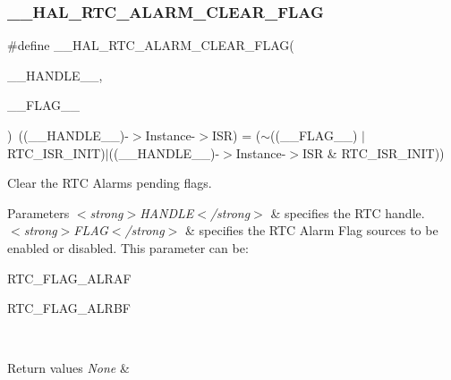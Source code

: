 \subsubsection{\texorpdfstring{\+\_\+\+\_\+\+H\+A\+L\+\_\+\+R\+T\+C\+\_\+\+A\+L\+A\+R\+M\+\_\+\+C\+L\+E\+A\+R\+\_\+\+F\+L\+AG}{\_\_HAL\_RTC\_ALARM\_CLEAR\_FLAG}}
{\footnotesize\ttfamily \#define \+\_\+\+\_\+\+H\+A\+L\+\_\+\+R\+T\+C\+\_\+\+A\+L\+A\+R\+M\+\_\+\+C\+L\+E\+A\+R\+\_\+\+F\+L\+AG(\begin{DoxyParamCaption}\item[{}]{\+\_\+\+\_\+\+H\+A\+N\+D\+L\+E\+\_\+\+\_\+,  }\item[{}]{\+\_\+\+\_\+\+F\+L\+A\+G\+\_\+\+\_\+ }\end{DoxyParamCaption})~((\+\_\+\+\_\+\+H\+A\+N\+D\+L\+E\+\_\+\+\_\+)-\/$>$Instance-\/$>$I\+SR) = ($\sim$((\+\_\+\+\_\+\+F\+L\+A\+G\+\_\+\+\_\+) $\vert$ R\+T\+C\+\_\+\+I\+S\+R\+\_\+\+I\+N\+IT)$\vert$((\+\_\+\+\_\+\+H\+A\+N\+D\+L\+E\+\_\+\+\_\+)-\/$>$Instance-\/$>$I\+SR \& R\+T\+C\+\_\+\+I\+S\+R\+\_\+\+I\+N\+IT))}



Clear the R\+TC Alarm\textquotesingle{}s pending flags. 


\begin{DoxyParams}{Parameters}
{\em $<$strong$>$\+H\+A\+N\+D\+L\+E$<$/strong$>$} & specifies the R\+TC handle. \\
\hline
{\em $<$strong$>$\+F\+L\+A\+G$<$/strong$>$} & specifies the R\+TC Alarm Flag sources to be enabled or disabled. This parameter can be\+: \begin{DoxyItemize}
\item R\+T\+C\+\_\+\+F\+L\+A\+G\+\_\+\+A\+L\+R\+AF \item R\+T\+C\+\_\+\+F\+L\+A\+G\+\_\+\+A\+L\+R\+BF \end{DoxyItemize}
\\
\hline
\end{DoxyParams}

\begin{DoxyRetVals}{Return values}
{\em None} & \\
\hline
\end{DoxyRetVals}
\mbox{\label{group___r_t_c___exported___macros_gadc2d6dc4a75136bdd2b67c1b35d04b10}} 
